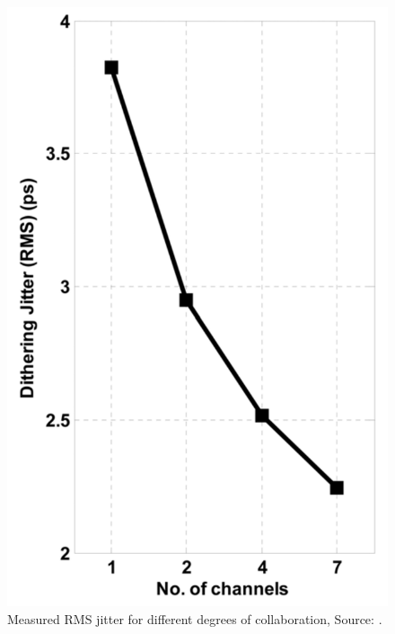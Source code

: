 \begin{figure}	\centering
	
	\includegraphics[width=0.7\linewidth]{Figures/Rep1Result.png}
	\caption{Measured RMS jitter for different degrees of collaboration, Source: \cite{agrawal20098}.} 
    \label{fig:rep1:result}
\end{figure}




